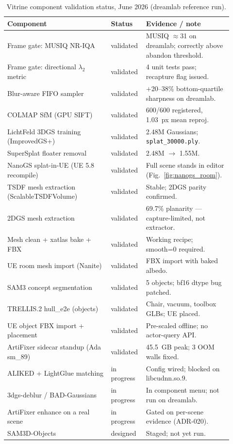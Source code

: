 \begin{table}[ht]
\centering
\small
\caption{Vitrine component validation status, June 2026 (dreamlab reference run).}
\label{tab:validated}
\begin{tabular}{p{0.44\linewidth} p{0.13\linewidth} p{0.35\linewidth}}
\toprule
\textbf{Component} & \textbf{Status} & \textbf{Evidence / note} \\
\midrule
Frame gate: MUSIQ NR-IQA                   & validated   & MUSIQ $\approx$31 on dreamlab; correctly above abandon threshold. \\
Frame gate: directional $\lambda_2$ metric & validated   & 4 unit tests pass; recapture flag issued. \\
Blur-aware FIFO sampler                    & validated   & $+$20--38\% bottom-quartile sharpness on dreamlab. \\
COLMAP SfM (GPU SIFT)                      & validated   & 600/600 registered, 1.03~px mean reproj. \\
LichtFeld 3DGS training (ImprovedGS+)      & validated   & 2.48M Gaussians; \texttt{splat\_30000.ply}. \\
SuperSplat floater removal                 & validated   & 2.48M $\rightarrow$ 1.55M. \\
NanoGS splat-in-UE (UE 5.8 recompile)     & validated   & Full scene stands in editor (Fig.~\ref{fig:nanogs_room}). \\
TSDF mesh extraction (ScalableTSDFVolume)  & validated   & Stable; 2DGS parity confirmed. \\
2DGS mesh extraction                       & validated   & 69.7\% planarity --- capture-limited, not extractor. \\
Mesh clean + xatlas bake + FBX             & validated   & Working recipe; smooth=0 required. \\
UE room mesh import (Nanite)               & validated   & FBX import with baked albedo. \\
SAM3 concept segmentation                  & validated   & 5 objects; bf16 dtype bug patched. \\
TRELLIS.2 hull\_e2e (objects)              & validated   & Chair, vacuum, toolbox GLBs; UE placed. \\
UE object FBX import + placement           & validated   & Pre-scaled offline; no actor-query API. \\
ArtiFixer sidecar standup (Ada sm\_89)     & validated   & 45.5~GB peak; 3 OOM walls fixed. \\
ALIKED + LightGlue matching                & in progress & Config wired; blocked on libcudnn.so.9. \\
3dgs-deblur / BAD-Gaussians                & in progress & In component menu; not run on dreamlab. \\
ArtiFixer enhance on a real scene          & in progress & Gated on per-scene evidence (ADR-020). \\
SAM3D-Objects                              & designed    & Staged; not yet run. \\
\bottomrule
\end{tabular}
\end{table}

